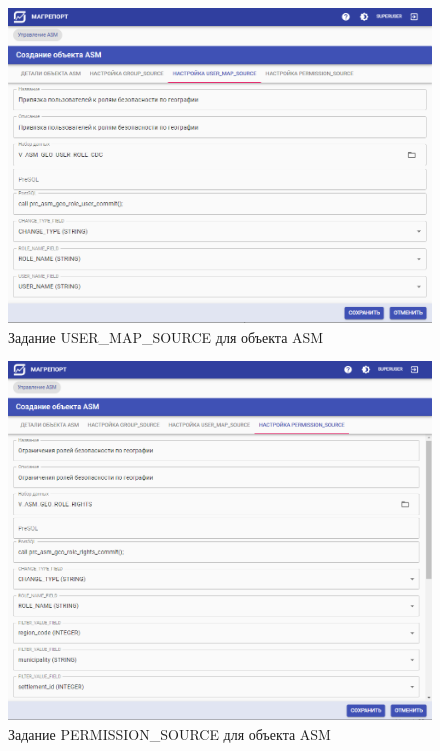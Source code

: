 \documentclass[../user-manual.tex]{subfiles}
\begin{document}
	\begin{figure}[h]
		\centering
		\includegraphics[width=\graphicswidth]{img/20-asm-user-map-source.png}
		\caption{Задание USER\_MAP\_SOURCE для объекта ASM}
		\label{fig:asm-user-map-source}
	\end{figure}


	\begin{figure}[h]
		\centering
		\includegraphics[width=\graphicswidth]{img/21-asm-permission-source-1.png}
		\caption{Задание PERMISSION\_SOURCE для объекта ASM}
		\label{fig:asm-permission-source-1}
	\end{figure}
\end{document}
